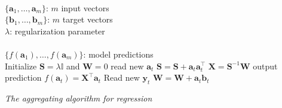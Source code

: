 \begin{algorithm}[ht]
\begin{algorithmic}[1]
\REQUIRE $\,$ \\
$\{\mathbf{a}_1,\dots,\mathbf{a}_{m} \}$: $m$ input vectors \\
$\{\mathbf{b}_1,\dots,\mathbf{b}_{m} \}$: $m$ target vectors \\
$\lambda$: regularization parameter \\
\ENSURE  $\,$ \\
$\{f(\mathbf{a}_1),\dots,f(\mathbf{a}_{m}) \}$: model predictions \\
\STATE Initialize $\mathbf{S}=\lambda \mathbb{I}$
and $\mathbf{W}=0$
	\STATE read new $\mathbf{a}_t$
   	\STATE $\mathbf{S} = \mathbf{S} + \mathbf{a}_t \mathbf{a}_t^\intercal$
	\STATE $\mathbf{X}=\mathbf{S}^{-1}\mathbf{W}$
	\STATE output prediction $f(\mathbf{a}_t) = \mathbf{X}^\intercal \mathbf{a}_t$
   	\STATE Read new $\mathbf{y}_t$
    	\STATE $\mathbf{W} = \mathbf{W} + \mathbf{a}_t \mathbf{b}_t$
\ENDFOR
\end{algorithmic}
\caption{{\em The aggregating algorithm for regression}}
\label{alg:AAR}
\end{algorithm}


